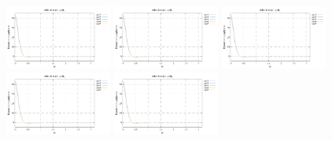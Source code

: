 \noindent
\includegraphics[width=3.5cm]{python_codes/fieldstone_152/RESULTS/exp2/d_t_32_m2}
\includegraphics[width=3.5cm]{python_codes/fieldstone_152/RESULTS/exp2/d_t_32_m3}
\includegraphics[width=3.5cm]{python_codes/fieldstone_152/RESULTS/exp2/d_t_32_m4}
\includegraphics[width=3.5cm]{python_codes/fieldstone_152/RESULTS/exp2/d_t_32_m5}
\includegraphics[width=3.5cm]{python_codes/fieldstone_152/RESULTS/exp2/d_t_32_m6}

